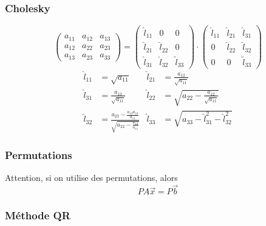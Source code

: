 \documentclass[resume]{subfiles}
\begin{document}
\subsubsection{Cholesky}
$$\begin{pmatrix}
a_{11} & a_{12} & a_{13}\\
a_{12} & a_{22} & a_{23}\\
a_{13} & a_{23} & a_{33}
\end{pmatrix}=\begin{pmatrix}
\hat{l}_{11} & 0 & 0\\
\hat{l}_{21} & \hat{l}_{22} & 0\\
\hat{l}_{31} & \hat{l}_{32} & \tilde{l}_{33}
\end{pmatrix}\cdot\begin{pmatrix}
\hat{l}_{11} & \hat{l}_{21} & \hat{l}_{31}\\
0 & \hat{l}_{22} & \hat{l}_{32}\\
0 & 0 & \tilde{l}_{33}
\end{pmatrix}$$
\begin{align*}
\hat{l}_{11}&=\sqrt{a_{11}} & \hat{l}_{21}&=\frac{a_{12}}{\sqrt{a_{11}}}\\
\hat{l}_{31}&=\frac{a_{13}}{\sqrt{a_{11}}} & \hat{l}_{22}&=\sqrt{a_{22}-\frac{a_{12}}{\sqrt{a_{11}}}}\\
\hat{l}_{32}&=\frac{a_{23}-\frac{a_{13}a_{12}}{a_{11}}}{\sqrt{a_{22}-\frac{a_{12}}{a_{11}}}} & \hat{l}_{33}&=\sqrt{a_{33}-\hat{l}_{31}^2-\hat{l}_{32}^2}
\end{align*}
\subsubsection{Permutations}
Attention, si on utilise des permutations, alors
$$PA\vec{x}=P\vec{b}$$
\subsubsection{Méthode QR}
\end{document}
